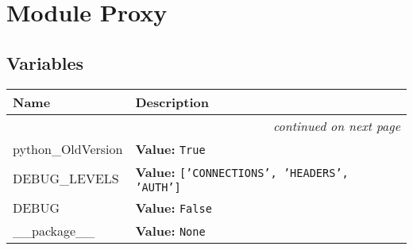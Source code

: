 %
%
%


\section{Module Proxy}

    \label{Proxy}


  \subsection{Variables}

    \vspace{-1cm}
\hspace{\varindent}\begin{longtable}{|p{\varnamewidth}|p{\vardescrwidth}|l}
\cline{1-2}
\cline{1-2} \centering \textbf{Name} & \centering \textbf{Description}& \\
\cline{1-2}
\endhead\cline{1-2}\multicolumn{3}{r}{\small\textit{continued on next page}}\\\endfoot\cline{1-2}
\endlastfoot\raggedright p\-y\-t\-h\-o\-n\-\_\-O\-l\-d\-V\-e\-r\-s\-i\-o\-n\- & \raggedright \textbf{Value:} 
{\tt True}&\\
\cline{1-2}
\raggedright D\-E\-B\-U\-G\-\_\-L\-E\-V\-E\-L\-S\- & \raggedright \textbf{Value:} 
{\tt \texttt{[}\texttt{'}\texttt{CONNECTIONS}\texttt{'}\texttt{, }\texttt{'}\texttt{HEADERS}\texttt{'}\texttt{, }\texttt{'}\texttt{AUTH}\texttt{'}\texttt{]}}&\\
\cline{1-2}
\raggedright D\-E\-B\-U\-G\- & \raggedright \textbf{Value:} 
{\tt False}&\\
\cline{1-2}
\raggedright \_\-\_\-p\-a\-c\-k\-a\-g\-e\-\_\-\_\- & \raggedright \textbf{Value:} 
{\tt None}&\\
\cline{1-2}
\end{longtable}



